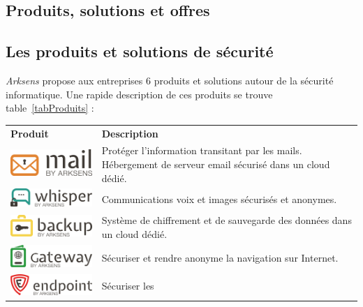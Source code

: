 \documentclass[a4paper,10pt, twoside]{report}
\begin{document}
\begin{spacing}{1.2}
\section{Produits, solutions et offres}
\subsection{Les produits et solutions de s\'ecurit\'e}
\textit{Arksens} propose aux entreprises 6 produits et solutions autour de la
s\'ecurit\'e informatique. Une rapide description de ces produits se trouve
table~\ref{tabProduits} :
\begin{table}[h!]
  \centering
  \def\arraystretch{1.5}
  \setlength{\fboxsep}{13pt} %
  \setlength{\fboxrule}{0pt} %
  \begin{tabular}{m{6cm}m{6cm}}
   \rowcolor{arkred} 
    \arrayrulecolor{gray73}\hline
    \color{white} \textbf{Produit} & \color{white} \textbf{Description} \\
    \includegraphics[width=5cm, fbox]{produits/mail.png} & Prot\'eger l'information
    transitant par les mails. H\'ebergement de serveur email s\'ecuris\'e dans
    un cloud d\'edi\'e.\\
    \hline
    \includegraphics[width=5cm, fbox]{produits/whisper.png} & Communications voix
    et images s\'ecuris\'es et anonymes.\\
    \hline
    \includegraphics[width=5cm, fbox]{produits/backup.png} & Syst\`eme de
    chiffrement et de sauvegarde des donn\'ees dans un cloud d\'edi\'e.\\
    \hline
    \includegraphics[width=5cm, fbox]{produits/gateway.png} & S\'ecuriser et
    rendre anonyme la navigation sur Internet.\\
    \hline
    \includegraphics[width=5cm, fbox]{produits/endpoint.png} & S\'ecuriser les

\end{tabular}
\end{table}
\end{spacing}
\end{document}
